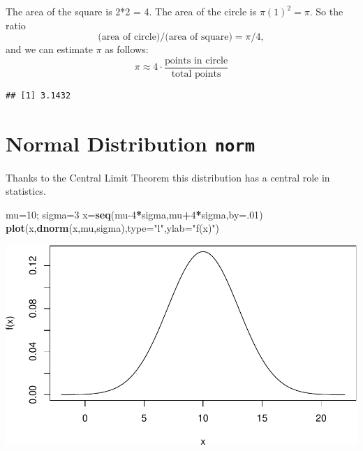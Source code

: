 \documentclass[
]{book}
\newenvironment{Shaded}{\begin{snugshade}}{\end{snugshade}}
\newcommand{\AttributeTok}[1]{\textcolor[rgb]{0.13,0.29,0.53}{#1}}
\newcommand{\CommentTok}[1]{\textcolor[rgb]{0.56,0.35,0.01}{\textit{#1}}}
\newcommand{\DecValTok}[1]{\textcolor[rgb]{0.00,0.00,0.81}{#1}}
\newcommand{\FunctionTok}[1]{\textcolor[rgb]{0.13,0.29,0.53}{\textbf{#1}}}
\newcommand{\NormalTok}[1]{#1}
\newcommand{\OtherTok}[1]{\textcolor[rgb]{0.56,0.35,0.01}{#1}}
\newcommand{\SpecialCharTok}[1]{\textcolor[rgb]{0.81,0.36,0.00}{\textbf{#1}}}
\newcommand{\StringTok}[1]{\textcolor[rgb]{0.31,0.60,0.02}{#1}}
\theoremstyle{definition}
\theoremstyle{definition}
\theoremstyle{definition}
\theoremstyle{definition}
\theoremstyle{remark}
\begin{document}
The area of the square is 2*2 = 4.
The area of the circle is \(\pi (1)^2 = \pi.\) So the ratio\\
\[\text{(area of circle)/(area of square)}=\pi/4,\]
and we can estimate \(\pi\) as follows:
\[\pi \approx 4\cdot \frac{\text{points in circle}}{\text{total points}}\]

\begin{Shaded}
\end{Shaded}

\begin{verbatim}
## [1] 3.1432
\end{verbatim}

\section{\texorpdfstring{Normal Distribution \texttt{norm}}{Normal Distribution norm}}\label{normalR}

Thanks to the Central Limit Theorem this distribution has a central role in statistics.

\begin{Shaded}
\begin{Highlighting}[]
\NormalTok{mu}\OtherTok{=}\DecValTok{10}\NormalTok{; sigma}\OtherTok{=}\DecValTok{3}
\NormalTok{x}\OtherTok{=}\FunctionTok{seq}\NormalTok{(mu}\DecValTok{{-}4}\SpecialCharTok{*}\NormalTok{sigma,mu}\SpecialCharTok{+}\DecValTok{4}\SpecialCharTok{*}\NormalTok{sigma,}\AttributeTok{by=}\NormalTok{.}\DecValTok{01}\NormalTok{)}
\FunctionTok{plot}\NormalTok{(x,}\FunctionTok{dnorm}\NormalTok{(x,mu,sigma),}\AttributeTok{type=}\StringTok{"l"}\NormalTok{,}\AttributeTok{ylab=}\StringTok{"f(x)"}\NormalTok{)}
\end{Highlighting}
\end{Shaded}

\includegraphics{math340-notes_files/figure-latex/unnamed-chunk-175-1.pdf}
\end{document}
